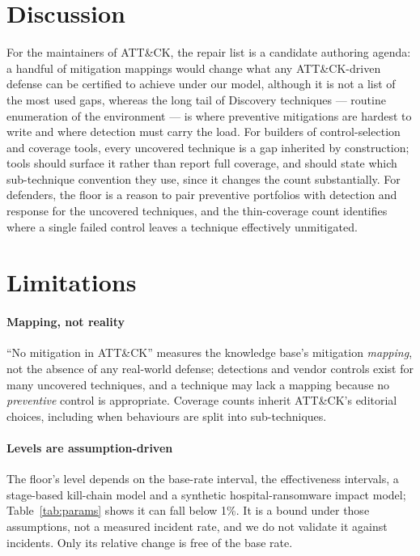 \documentclass[conference,compsoc]{IEEEtran}
\begin{document}
\section{Discussion}
For the maintainers of ATT\&CK, the repair list is a candidate authoring agenda: a
handful of mitigation mappings would change what any ATT\&CK-driven defense can be
certified to achieve under our model, although it is not a list of the most used
gaps, whereas the long tail of Discovery techniques ---
routine enumeration of the environment --- is where preventive mitigations are hardest
to write and where detection must carry the load. For builders of control-selection and
coverage tools, every uncovered technique is a gap inherited by construction; tools
should surface it rather than report full coverage, and should state which sub-technique
convention they use, since it changes the count substantially. For defenders, the floor
is a reason to pair preventive portfolios with detection and response for the uncovered
techniques, and the thin-coverage count identifies where a single failed control leaves a
technique effectively unmitigated.

\section{Limitations}
\paragraph{Mapping, not reality} ``No mitigation in ATT\&CK'' measures the knowledge
base's mitigation \emph{mapping}, not the absence of any real-world defense; detections
and vendor controls exist for many uncovered techniques, and a technique may lack a
mapping because no \emph{preventive} control is appropriate. Coverage counts inherit
ATT\&CK's editorial choices, including when behaviours are split into sub-techniques.

\paragraph{Levels are assumption-driven} The floor's level depends on the base-rate
interval, the effectiveness intervals, a stage-based kill-chain model and a synthetic
hospital-ransomware impact model; Table~\ref{tab:params} shows it can fall below 1\%.
It is a bound under those assumptions, not a measured incident rate, and we do not
validate it against incidents. Only its relative change is free of the base rate.
\end{document}
